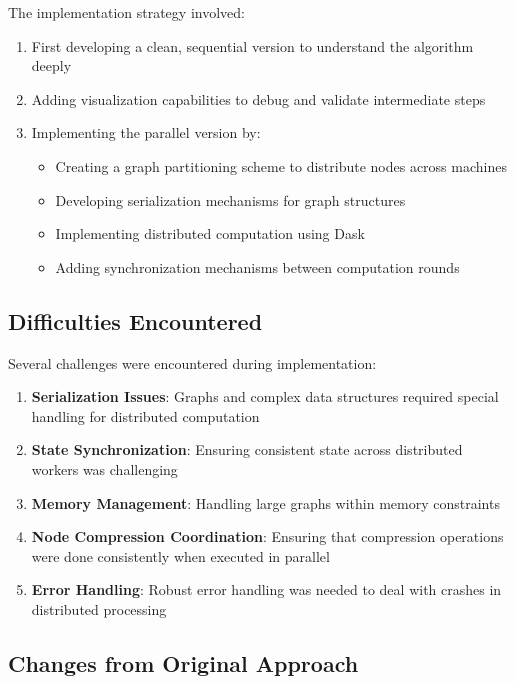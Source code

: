 \documentclass[11pt,a4paper]{article}
\begin{document}
The implementation strategy involved:

\begin{enumerate}
    \item First developing a clean, sequential version to understand the algorithm deeply
    \item Adding visualization capabilities to debug and validate intermediate steps
    \item Implementing the parallel version by:
    \begin{itemize}
        \item Creating a graph partitioning scheme to distribute nodes across machines
        \item Developing serialization mechanisms for graph structures
        \item Implementing distributed computation using Dask
        \item Adding synchronization mechanisms between computation rounds
    \end{itemize}
\end{enumerate}

\subsection{Difficulties Encountered}

Several challenges were encountered during implementation:

\begin{enumerate}
    \item \textbf{Serialization Issues}: Graphs and complex data structures required special handling for distributed computation
    \item \textbf{State Synchronization}: Ensuring consistent state across distributed workers was challenging
    \item \textbf{Memory Management}: Handling large graphs within memory constraints
    \item \textbf{Node Compression Coordination}: Ensuring that compression operations were done consistently when executed in parallel
    \item \textbf{Error Handling}: Robust error handling was needed to deal with crashes in distributed processing
\end{enumerate}

\subsection{Changes from Original Approach}
\end{document}
